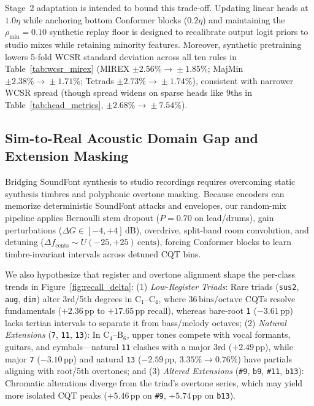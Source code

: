 Stage~2 adaptation is intended to bound this trade-off. Updating linear heads at $1.0\eta$ while anchoring bottom Conformer blocks ($0.2\eta$) and maintaining the $\rho_{\min} = 0.10$ synthetic replay floor is designed to recalibrate output logit priors to studio mixes while retaining minority features. Moreover, synthetic pretraining lowers 5-fold WCSR standard deviation across all ten rules in Table~\ref{tab:wcsr_mirex} (MIREX $\pm 2.56\% \!\to\! \pm 1.85\%$; MajMin $\pm 2.38\% \!\to\! \pm 1.71\%$; Tetrads $\pm 2.73\% \!\to\! \pm 1.74\%$), consistent with narrower WCSR spread (though spread widens on sparse heads like 9ths in Table~\ref{tab:head_metrics}, $\pm 2.68\% \!\to\! \pm 7.54\%$).

\subsection{Sim-to-Real Acoustic Domain Gap and Extension Masking}\label{subsec:acoustic_domain_gap}

Bridging SoundFont synthesis to studio recordings requires overcoming static synthesis timbres and polyphonic overtone masking. Because encoders can memorize deterministic SoundFont attacks and envelopes, our random-mix pipeline applies Bernoulli stem dropout ($P=0.70$ on lead/drums), gain perturbations ($\Delta G \in [-4, +4]\,\text{dB}$), overdrive, split-band room convolution, and detuning ($\Delta f_{\text{cents}} \sim U(-25, +25)\,\text{cents}$), forcing Conformer blocks to learn timbre-invariant intervals across detuned CQT bins.

We also hypothesize that register and overtone alignment shape the per-class trends in Figure~\ref{fig:recall_delta}: (1) \textit{Low-Register Triads}: Rare triads ({\small\texttt{sus2}}, {\small\texttt{aug}}, {\small\texttt{dim}}) alter 3rd/5th degrees in $\text{C}_1$--$\text{C}_4$, where $36\,\text{bins/octave}$ CQTs resolve fundamentals ($+2.36\,\text{pp}$ to $+17.65\,\text{pp}$ recall), whereas bare-root {\small\texttt{1}} ($-3.61\,\text{pp}$) lacks tertian intervals to separate it from bass/melody octaves; (2) \textit{Natural Extensions} ({\small\texttt{7}}, {\small\texttt{11}}, {\small\texttt{13}}): In $\text{C}_4$--$\text{B}_6$, upper tones compete with vocal formants, guitars, and cymbals---natural {\small\texttt{11}} clashes with a major 3rd ($+2.49\,\text{pp}$), while major {\small\texttt{7}} ($-3.10\,\text{pp}$) and natural {\small\texttt{13}} ($-2.59\,\text{pp}$, $3.35\% \!\to\! 0.76\%$) have partials aligning with root/5th overtones; and (3) \textit{Altered Extensions} ({\small\texttt{\#9}}, {\small\texttt{b9}}, {\small\texttt{\#11}}, {\small\texttt{b13}}): Chromatic alterations diverge from the triad's overtone series, which may yield more isolated CQT peaks ($+5.46\,\text{pp}$ on {\small\texttt{\#9}}, $+5.74\,\text{pp}$ on {\small\texttt{b13}}).
